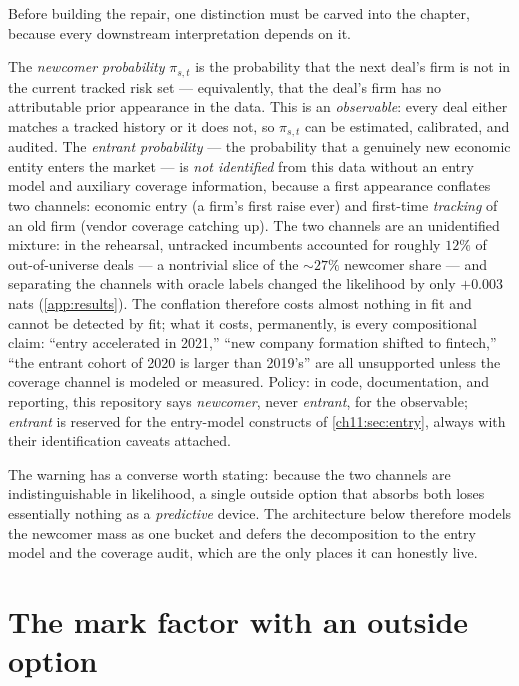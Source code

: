 Before building the repair, one distinction must be carved into the
chapter, because every downstream interpretation depends on it.

\begin{warning}\label{warn:ch11:entrant}
The \emph{newcomer probability} $\pi_{s,t}$ is the probability that the
next deal's firm is not in the current tracked risk set --- equivalently,
that the deal's firm has no attributable prior appearance in the data.
This is an \emph{observable}: every deal either matches a tracked history
or it does not, so $\pi_{s,t}$ can be estimated, calibrated, and audited.
The \emph{entrant probability} --- the probability that a genuinely new
economic entity enters the market --- is \emph{not identified} from this
data without an entry model and auxiliary coverage information, because a
first appearance conflates two channels: economic entry (a firm's first
raise ever) and first-time \emph{tracking} of an old firm (vendor
coverage catching up). The two channels are an unidentified mixture: in
the rehearsal, untracked incumbents accounted for roughly $12\%$ of
out-of-universe deals --- a nontrivial slice of the $\sim 27\%$ newcomer
share --- and
separating the channels with oracle labels changed the likelihood by only
$+0.003$ nats (\cref{app:results}). The conflation therefore costs almost
nothing in fit and cannot be detected by fit; what it costs, permanently,
is every compositional claim: ``entry accelerated in 2021,'' ``new
company formation shifted to fintech,'' ``the entrant cohort of 2020 is
larger than 2019's'' are all unsupported unless the coverage channel is
modeled or measured. Policy: in code, documentation, and reporting, this
repository says \emph{newcomer}, never \emph{entrant}, for the observable;
\emph{entrant} is reserved for the entry-model constructs of
\cref{ch11:sec:entry}, always with their identification caveats attached.
\end{warning}

The warning has a converse worth stating: because the two channels are
indistinguishable in likelihood, a single outside option that absorbs
both loses essentially nothing as a \emph{predictive} device. The
architecture below therefore models the newcomer mass as one bucket and
defers the decomposition to the entry model and the coverage audit, which
are the only places it can honestly live.

\section{The mark factor with an outside option}\label{ch11:sec:outside}

